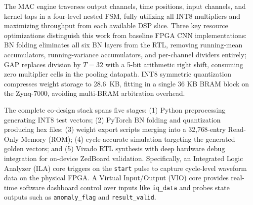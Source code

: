 \documentclass[conference]{IEEEtran}
\begin{document}
The MAC engine traverses output channels, time positions, input channels, and kernel taps in a four-level nested FSM, fully utilizing all INT8 multipliers and maximizing throughput from each available DSP slice. Three key resource optimizations distinguish this work from baseline FPGA CNN implementations: BN folding eliminates all six BN layers from the RTL, removing running-mean accumulators, running-variance accumulators, and per-channel dividers entirely; GAP replaces division by $T=32$ with a 5-bit arithmetic right shift, consuming zero multiplier cells in the pooling datapath. INT8 symmetric quantization compresses weight storage to 28.6~KB, fitting in a single 36 KB BRAM block on the Zynq-7000, avoiding multi-BRAM arbitration overhead.

The complete co-design stack spans five stages: (1) Python preprocessing generating INT8 test vectors; (2) PyTorch BN folding and quantization producing hex files; (3) weight export scripts merging into a 32,768-entry Read-Only Memory (ROM); (4) cycle-accurate simulation targeting the generated golden vectors; and (5) Vivado RTL synthesis with deep hardware debug integration for on-device ZedBoard validation. Specifically, an Integrated Logic Analyzer (ILA) core triggers on the \texttt{start} pulse to capture cycle-level waveform data on the physical FPGA. %
A Virtual Input/Output (VIO) core provides real-time software dashboard control over inputs like \texttt{iq\_data} and probes state outputs such as \texttt{anomaly\_flag} and \texttt{result\_valid}.



\end{document}

